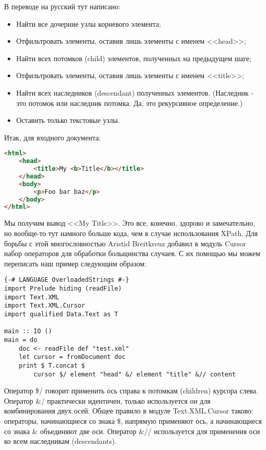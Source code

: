 В переводе на русский тут написано:

\begin{itemize}
\item Найти все дочерние узлы корневого элемента;
\item Отфильтровать элементы, оставив лишь элементы с именем <<head>>;
\item Найти всех потомков (child) элементов, полученных на предыдущем шаге;
\item Отфильтровать элементы, оставив лишь элементы с именем <<title>>;
\item Найти всех наследников (descendant) полученных элементов. (Наследник - это потомок или наследник потомка. Да, это рекурсивное определение.)
\item Оставить только текстовые узлы.
\end{itemize}

Итак, для входного документа:

\begin{lstlisting}[language=HTML]
  <html>
    <head>
        <title>My <b>Title</b></title>
    </head>
    <body>
        <p>Foo bar baz</p>
    </body>
</html>
\end{lstlisting}

Мы получим вывод <<My Title>>. Это все, конечно, здорово и замечательно, но вообще-то тут намного больше кода, чем в случае использования XPath. Для борьбы с этой многословностью Aristid Breitkreuz добавил в модуль Cursor набор операторов для обработки больщинства случаев. С их помощью мы можем переписать наш пример следующим образом:

\begin{lstlisting}
{-# LANGUAGE OverloadedStrings #-}
import Prelude hiding (readFile)
import Text.XML
import Text.XML.Cursor
import qualified Data.Text as T

main :: IO ()
main = do
    doc <- readFile def "test.xml"
    let cursor = fromDocument doc
    print $ T.concat $
        cursor $/ element "head" &/ element "title" &// content
\end{lstlisting}%

Оператор \$/ говорит применить ось справа к потомкам (children) курсора слева. Оператор \&/ практически идентичен, только используется он для комбинирования двух осей. Общее правило в модуле Text.XML.Cursor таково: операторы, начинающиеся со знака \$, напрямую применяют ось, а начинающиеся со знака \& объединяют две оси. Оператор \&// используется для применения оси ко всем наследникам (descendants).

